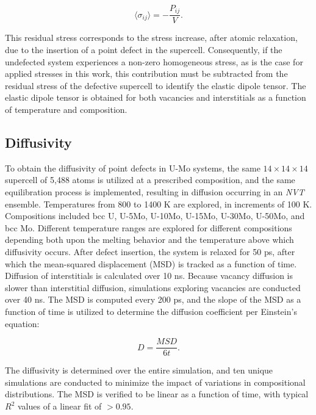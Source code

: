 \documentclass[review]{elsarticle}
\begin{document}
\begin{equation}\label{eq:dipole2}
    \langle \sigma_{ij} \rangle = - \frac{P_{ij}}{V}.
\end{equation}

This residual stress corresponds to the stress increase, after atomic relaxation, due to the insertion of a point defect in the supercell. Consequently, if the undefected system experiences a non-zero homogeneous stress, as is the case for applied stresses in this work, this contribution must be subtracted from the residual stress of the defective supercell to identify the elastic dipole tensor. The elastic dipole tensor is obtained for both vacancies and interstitials as a function of temperature and composition.




\subsection{Diffusivity}

To obtain the diffusivity of point defects in U-Mo systems, the same $14 \times 14 \times 14$ supercell of 5,488 atoms is utilized at a prescribed composition, and the same equilibration process is implemented, resulting in diffusion occurring in an \textit{NVT} ensemble. Temperatures from 800 to 1400 K are explored, in increments of 100 K. Compositions included bcc U, U-5Mo, U-10Mo, U-15Mo, U-30Mo, U-50Mo, and bcc Mo. Different temperature ranges are explored for different compositions depending both upon the melting behavior and the temperature above which diffusivity occurs. After defect insertion, the system is relaxed for 50 ps, after which the mean-squared displacement (MSD) is tracked as a function of time. Diffusion of interstitials is calculated over 10 ns. Because vacancy diffusion is slower than interstitial diffusion, simulations exploring vacancies are conducted over 40 ns. The MSD is computed every 200 ps, and the slope of the MSD as a function of time is utilized to determine the diffusion coefficient per Einstein's equation:

\begin{equation}
    D = \frac{MSD}{6t}.
\end{equation}

\noindent The diffusivity is determined over the entire simulation, and ten unique simulations are conducted to minimize the impact of variations in compositional distributions. The MSD is verified to be linear as a function of time, with typical $R^2$ values of a linear fit of $> 0.95$.
\end{document}
